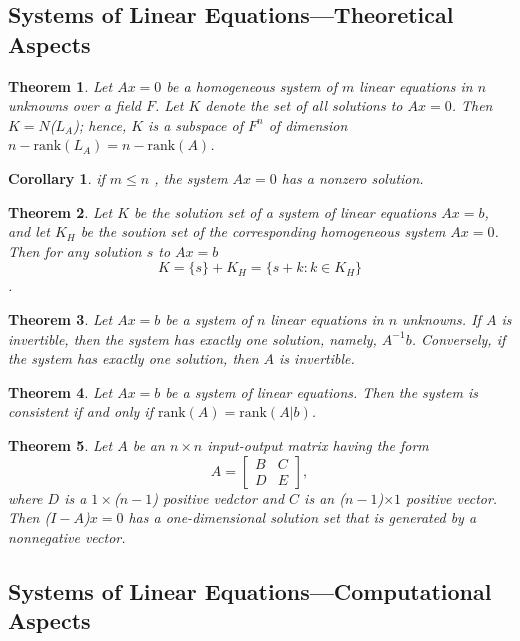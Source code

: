 \documentclass{article}
\theoremstyle{plain}
\newtheorem{theorem}{Theorem}[section]
\newtheorem{corollary}{Corollary}[section]
\begin{document}
\subsection{Systems of Linear Equations---Theoretical Aspects}
\begin{theorem}
    Let \( Ax = 0 \) be a homogeneous system of \( m \) linear equations in \( n \) unknowns over a field \( F \). Let \( K \) denote the set of all solutions to \( Ax = 0 \). Then \( K =  N\)(\(L_A\));
    hence, \( K \) is a subspace of \( F^n \) of dimension \( n - \text{rank}(L_A) = n - \text{rank}(A) \).
\end{theorem}
\vspace{3cm}
\begin{corollary}
    if \( m \leq n \) , the system \( Ax = 0 \) has a nonzero solution.
\end{corollary}
\vspace{3cm}
\begin{theorem}
    Let \( K \) be the solution set of a system of linear equations \( Ax = b \), and let \( K_H \) be the soution set of the corresponding homogeneous system \( Ax = 0 \).
    Then for any solution \( s \) to \( Ax = b \) \\
    \[ K = \{s\} + K_H = \{s+k: k \in K_H\} \].
\end{theorem}
\vspace{7cm}
\begin{theorem}
    Let \( Ax = b \) be a system of \( n \) linear equations in \( n \) unknowns. If \( A \) is invertible, then the system has exactly one solution, namely, \( A^{-1}b \).
    Conversely, if the system has exactly one solution, then \( A \) is invertible.
\end{theorem}
\vspace{7cm}
\begin{theorem}
    Let \( Ax = b \) be a system of linear equations. Then the system is consistent if and only if \(\text{rank}(A) = \text{rank}(A|b)\).
\end{theorem}
\vspace{5cm}
\begin{theorem}
    Let \( A \) be an \( n \times n \) input-output matrix having the form
    \[
    A = \begin{bmatrix}
        B & C \\
        D & E
        \end{bmatrix},
    \]
    where \( D \) is a \( 1 \times \)(\(n-1\)) positive vedctor and \( C \) is an (\(n-1\))\(\times 1\) positive vector. Then (\(I - A\))\(x = 0\) has a one-dimensional solution set that is generated by a nonnegative vector.
\end{theorem}
\newpage
\subsection{Systems of Linear Equations---Computational Aspects}
\end{document}
